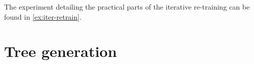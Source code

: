 The experiment detailing the practical parts of the iterative re-training can be found in \cref{ex:iter-retrain}.

\section{Tree generation}


